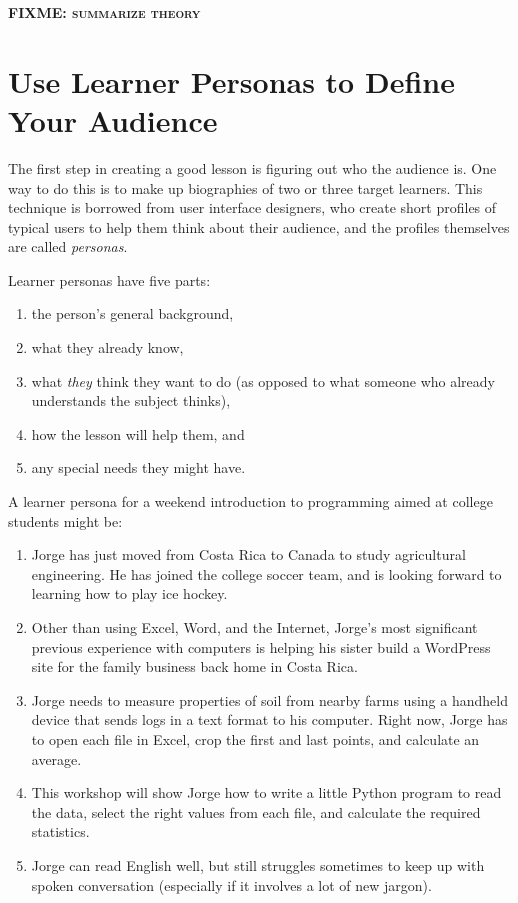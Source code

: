 \documentclass[10pt,letterpaper]{article}
\newcommand{\fixme}[1]{\textsc{\textbf{FIXME: {#1}}}}
\newcommand{\rulemajor}[1]{\section{#1}}
\begin{document}
\fixme{summarize theory}

\rulemajor{Use Learner Personas to Define Your Audience}

The first step in creating a good lesson is figuring out who the audience is.
One way to do this is to make up biographies of two or three target learners.
This technique is borrowed from user interface designers, who create short
profiles of typical users to help them think about their audience, and the
profiles themselves are called \emph{personas}.

Learner personas have five parts:

\begin{enumerate}

\item the person's general background,

\item what they already know,

\item what \emph{they} think they want to do (as opposed to what someone who
  already understands the subject thinks),

\item how the lesson will help them, and

\item any special needs they might have.

\end{enumerate}

A learner persona for a weekend introduction to programming aimed at college
students might be:

\begin{enumerate}

\item Jorge has just moved from Costa Rica to Canada to study agricultural
  engineering. He has joined the college soccer team, and is looking forward to
  learning how to play ice hockey.

\item Other than using Excel, Word, and the Internet, Jorge's most significant
  previous experience with computers is helping his sister build a WordPress
  site for the family business back home in Costa Rica.

\item Jorge needs to measure properties of soil from nearby farms using a
  handheld device that sends logs in a text format to his computer.  Right now,
  Jorge has to open each file in Excel, crop the first and last points, and
  calculate an average.

\item This workshop will show Jorge how to write a little Python program to read
  the data, select the right values from each file, and calculate the required
  statistics.

\item Jorge can read English well, but still struggles sometimes to keep up with
  spoken conversation (especially if it involves a lot of new jargon).

\end{enumerate}
  
\end{document}
